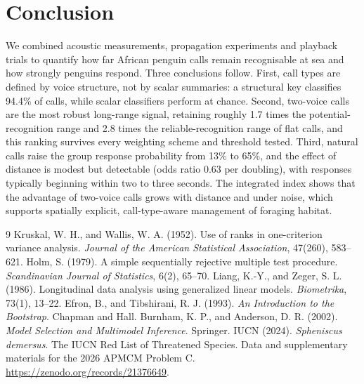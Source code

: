 \documentclass{apmcmthesis}
\begin{document}
\section{Conclusion}

We combined acoustic measurements, propagation experiments and playback trials to quantify how
far African penguin calls remain recognisable at sea and how strongly penguins respond. Three
conclusions follow. First, call types are defined by voice structure, not by scalar summaries:
a structural key classifies 94.4\% of calls, while scalar classifiers perform at chance. Second,
two-voice calls are the most robust long-range signal, retaining roughly 1.7 times the
potential-recognition range and 2.8 times the reliable-recognition range of flat calls, and this
ranking survives every weighting scheme and threshold tested. Third, natural calls raise the
group response probability from 13\% to 65\%, and the effect of distance is modest but
detectable (odds ratio 0.63 per doubling), with responses typically beginning within two to
three seconds. The integrated index shows that the advantage of two-voice calls grows with
distance and under noise, which supports spatially explicit, call-type-aware management of
foraging habitat.

\begin{thebibliography}{9}
 Kruskal, W. H., and Wallis, W. A. (1952). Use of ranks in one-criterion variance analysis. \textit{Journal of the American Statistical Association}, 47(260), 583--621.
 Holm, S. (1979). A simple sequentially rejective multiple test procedure. \textit{Scandinavian Journal of Statistics}, 6(2), 65--70.
 Liang, K.-Y., and Zeger, S. L. (1986). Longitudinal data analysis using generalized linear models. \textit{Biometrika}, 73(1), 13--22.
 Efron, B., and Tibshirani, R. J. (1993). \textit{An Introduction to the Bootstrap}. Chapman and Hall.
 Burnham, K. P., and Anderson, D. R. (2002). \textit{Model Selection and Multimodel Inference}. Springer.
 IUCN (2024). \textit{Spheniscus demersus}. The IUCN Red List of Threatened Species.
 Data and supplementary materials for the 2026 APMCM Problem C. \url{https://zenodo.org/records/21376649}.
\end{thebibliography}

\newpage
\appendix
\renewcommand{\thesection}{\Alph{section}}
\setcounter{section}{0}
\end{document}

